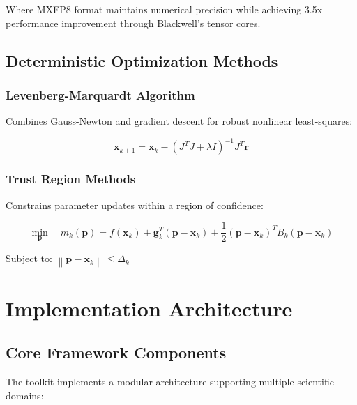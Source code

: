 \documentclass[11pt,a4paper]{article}
\begin{document}
Where MXFP8 format maintains numerical precision while achieving 3.5x performance improvement through Blackwell's tensor cores.

\subsection{Deterministic Optimization Methods}

\subsubsection{Levenberg-Marquardt Algorithm}
Combines Gauss-Newton and gradient descent for robust nonlinear least-squares:

\begin{equation}
\mathbf{x}_{k+1} = \mathbf{x}_k - \left(J^T J + \lambda I\right)^{-1} J^T \mathbf{r}
\end{equation}

\subsubsection{Trust Region Methods}
Constrains parameter updates within a region of confidence:

\begin{equation}
\min_{\mathbf{p}} \quad m_k(\mathbf{p}) = f(\mathbf{x}_k) + \mathbf{g}_k^T (\mathbf{p} - \mathbf{x}_k) + \frac{1}{2} (\mathbf{p} - \mathbf{x}_k)^T B_k (\mathbf{p} - \mathbf{x}_k)
\end{equation}

Subject to: \(\left\| \mathbf{p} - \mathbf{x}_k \right\| \leq \Delta_k\)

\section{Implementation Architecture}

\subsection{Core Framework Components}

The toolkit implements a modular architecture supporting multiple scientific domains:
\end{document}
